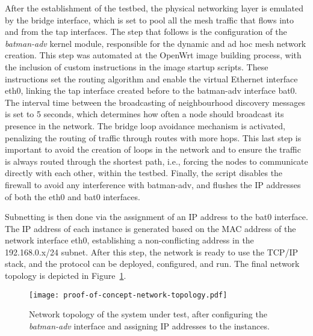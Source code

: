 After the establishment of the testbed, the physical networking layer is emulated by the bridge interface, which is set to pool all the mesh traffic that flows into and from the tap interfaces. The step that follows is the configuration of the \emph{batman-adv} kernel module, responsible for the dynamic and ad hoc mesh network creation. This step was automated at the OpenWrt image building process, with the inclusion of custom instructions in the image startup scripts. These instructions set the routing algorithm and enable the virtual Ethernet interface eth0, linking the tap interface created before to the batman-adv interface bat0. The interval time between the broadcasting of neighbourhood discovery messages is set to 5 seconds, which determines how often a node should broadcast its presence in the network. The bridge loop avoidance mechanism is activated, penalizing the routing of traffic through routes with more hops. This last step is important to avoid the creation of loops in the network and to ensure the traffic is always routed through the shortest path, i.e., forcing the nodes to communicate directly with each other, within the testbed. Finally, the script disables the firewall to avoid any interference with batman-adv, and flushes the IP addresses of both the eth0 and bat0 interfaces.

Subnetting is then done via the assignment of an IP address to the bat0 interface. The IP address of each instance is generated based on the MAC address of the network interface eth0, establishing a non-conflicting address in the 192.168.0.x/24 subnet. After this step, the network is ready to use the TCP/IP stack, and the \pol{} protocol can be deployed, configured, and run. The final network topology is depicted in Figure~\ref{fig:infrastructure:network-architecture}.

\begin{figure}[h!]
    \begin{center}
    \texttt{[image: proof-of-concept-network-topology.pdf]}
    \caption{Network topology of the system under test, after configuring the \emph{batman-adv} interface and assigning IP addresses to the instances.}
    \label{fig:infrastructure:network-architecture}
    \end{center}
\end{figure}
